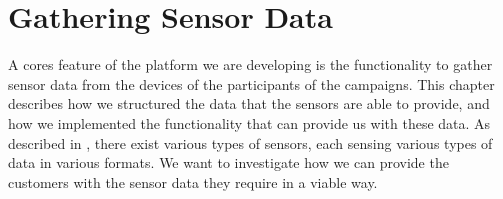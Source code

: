 \chapter{Gathering Sensor Data}
\label{cha:gathering_sensor_data}

A cores feature of the platform we are developing is the functionality to gather sensor data from the devices of the participants of the campaigns. This chapter describes how we structured the data that the sensors are able to provide, and how we implemented the functionality that can provide us with these data. As described in , there exist various types of sensors, each sensing various types of data in various formats. We want to investigate how we can provide the customers with the sensor data they require in a viable way.








